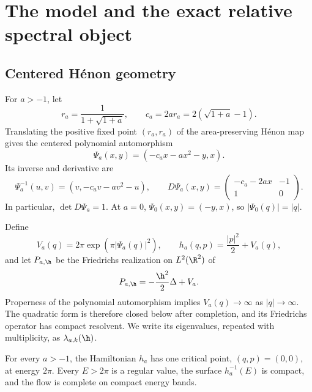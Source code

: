 \section{The model and the exact relative spectral object}
\label{sec:model-trace}

\subsection{Centered H\'enon geometry}

For \(a>-1\), let
\begin{equation}
 r_a=\frac{1}{1+\sqrt{1+a}},
 \qquad
 c_a=2ar_a=2(\sqrt{1+a}-1).
 \label{eq:ra-ca}
\end{equation}
Translating the positive fixed point \((r_a,r_a)\) of the area-preserving
H\'enon map gives the centered polynomial automorphism
\begin{equation}
 \Psi_a(x,y)=(-c_ax-ax^2-y,x).
 \label{eq:centered-henon}
\end{equation}
Its inverse and derivative are
\begin{equation}
 \Psi_a^{-1}(u,v)=(v,-c_av-av^2-u),
 \qquad
 D\Psi_a(x,y)=
 \begin{pmatrix}-c_a-2ax&-1\\1&0\end{pmatrix}.
 \label{eq:henon-inverse-jac}
\end{equation}
In particular, \(\det D\Psi_a=1\).  At \(a=0\),
\(\Psi_0(x,y)=(-y,x)\), so \(|\Psi_0(q)|=|q|\).

Define
\begin{equation}
 V_a(q)=2\pi\exp\!\left(\pi|\Psi_a(q)|^2\right),
 \qquad
 h_a(q,p)=\frac{|p|^2}{2}+V_a(q),
 \label{eq:potential-hamiltonian}
\end{equation}
and let \(P_{a,\h}\) be the Friedrichs realization on \(L^2(\R^2)\) of
\begin{equation}
 P_{a,\h}=-\frac{\h^2}{2}\Delta+V_a.
 \label{eq:semiclassical-operator}
\end{equation}
Properness of the polynomial automorphism implies
\(V_a(q)\to\infty\) as \(|q|\to\infty\).  The quadratic form is therefore
closed below after completion, and its Friedrichs operator has compact
resolvent.  We write its eigenvalues, repeated with multiplicity, as
\(\lambda_{a,k}(\h)\).

\begin{proposition}
\label{prop:regular-shells}
For every \(a>-1\), the Hamiltonian \(h_a\) has one critical point,
\((q,p)=(0,0)\), at energy \(2\pi\).  Every \(E>2\pi\) is a regular value,
the surface \(h_a^{-1}(E)\) is compact, and the flow is complete on compact
energy bands.
\end{proposition}

